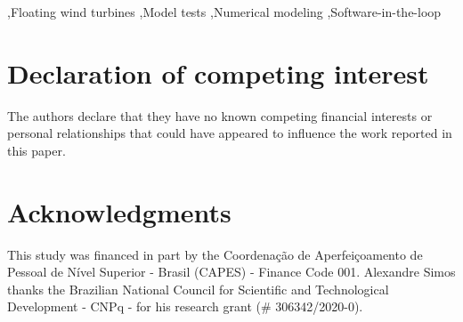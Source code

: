 \documentclass[a4paper,fleqn]{cas-sc}
\begin{document}



\begin{keywords}
    \sep Floating wind turbines \sep Model tests \sep Numerical modeling \sep Software-in-the-loop
\end{keywords}
  
\maketitle

\linenumbers







\printcredits

\section*{Declaration of competing interest}
The authors declare that they have no known competing financial interests or personal relationships that could have appeared to influence the work reported in this paper.

\section*{Acknowledgments}
This study was financed in part by the Coordenação de Aperfeiçoamento de Pessoal de Nível Superior - Brasil (CAPES) - Finance Code 001. Alexandre Simos thanks the Brazilian National Council for Scientific and Technological Development - CNPq - for his research grant (\# 306342/2020-0). 

%





%
\end{document}
